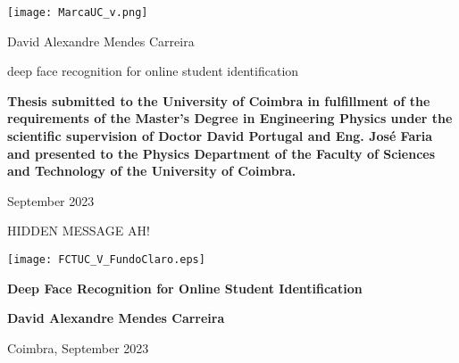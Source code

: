 \documentclass[class=report, crop=false, a4paper]{standalone}
\begin{document}

\pagecolor{CoverUC}\afterpage{\nopagecolor}

\begin{center}
    \color{CoverUCTypo}
    \texttt{[image: MarcaUC\_v.png]}
    \vspace{3cm}

    \fontsize{18pt}{18pt}\selectfont
    \par{\ArrusBt David Alexandre Mendes Carreira}
    \vspace{3cm}

    \fontsize{22pt}{22pt}\selectfont
    \par{\ArrusBtScB deep face recognition for online student identification}
    \fontsize{20pt}{20pt}\selectfont
    \vspace{2cm}

    \vfill
    \fontsize{12pt}{12pt}\selectfont
    \par\textbf{\ArrusBt Thesis submitted to the University of Coimbra in fulfillment of the
    requirements of the Master’s Degree in Engineering Physics
    under the scientific supervision of Doctor David Portugal and Eng.
    José Faria and presented to the Physics Department of the
    Faculty of Sciences and Technology of the University of Coimbra.}
    
    \vfill
    \fontsize{16pt}{16pt}\selectfont
    \par {\ArrusBt September 2023}
\end{center}
\restoregeometry

\newpage
\color{white}\selectfont
HIDDEN MESSAGE AH!
\restoregeometry
\newpage
\color{black}\selectfont
\begin{center}
    \vspace{1cm}
    \texttt{[image: FCTUC\_V\_FundoClaro.eps]}
    
    \vspace{4cm}
    \selectfont\Huge{\textbf{Deep Face Recognition for Online Student Identification}}\par
    
    \vfill
    {\large{\textbf{David Alexandre Mendes Carreira}}}
    
    \vspace{0.5cm}
    {\large Coimbra, September 2023\par}    
    
    
\end{center}
\end{document}
